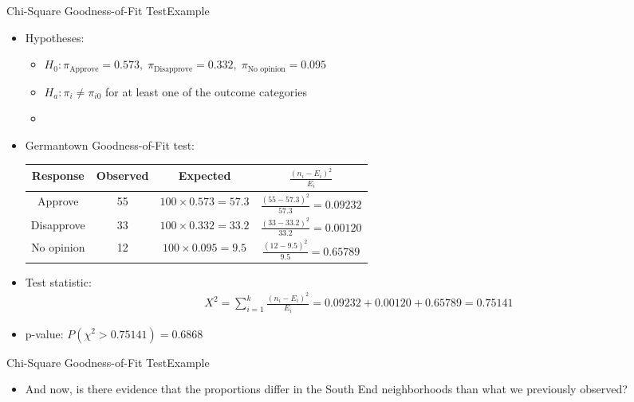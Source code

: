 \documentclass[xcolor=dvipsnames]{beamer}
\begin{document}
\begin{frame}{Chi-Square Goodness-of-Fit Test}{Example}
\begin{itemize}
	\item Hypotheses:
	\begin{itemize}
		\item $H_0: \pi_{\text{Approve}} = 0.573,\; \pi_{\text{Disapprove}} = 0.332,\; \pi_{\text{No opinion}}=0.095$
		\item $H_a: \pi_i \neq \pi_{i0}$ for at least one of the outcome categories
		\item[]
	\end{itemize}
	\item Germantown Goodness-of-Fit test:
	{\scriptsize
	\begin{center}
		\begin{tabular}{cccc}
			\hline
			Response & Observed & Expected & $\frac{(n_i-E_i)^2}{E_i}$ \\ \hline \hline
			Approve & 55 & $100 \times 0.573 = 57.3$ & $\frac{(55-57.3)^2}{57.3} = 0.09232$\\
			Disapprove & 33 & $100 \times 0.332 = 33.2$ & $\frac{(33-33.2)^2}{33.2} = 0.00120$\\
			No opinion & 12 & $100 \times 0.095 = 9.5$ & $\frac{(12-9.5)^2}{9.5}=0.65789$\\ \hline
		\end{tabular}
	\end{center}}\pause
	\vspace{1mm}
	\item Test statistic: \pause
	\begin{gather*}
	X^2 = \sum_{i=1}^k \frac{(n_i-E_i)^2}{E_i} = 0.09232 + 0.00120 + 0.65789 = 0.75141
	\end{gather*} \pause
	\item p-value: $P(\chi^2 > 0.75141) = 0.6868$
\end{itemize}
\end{frame}

\begin{frame}{Chi-Square Goodness-of-Fit Test}{Example}
	\begin{itemize}
		\item And now, is there evidence that the proportions differ in the South End neighborhoods than what we previously observed?
	\end{itemize}
\end{frame}
\end{document}

